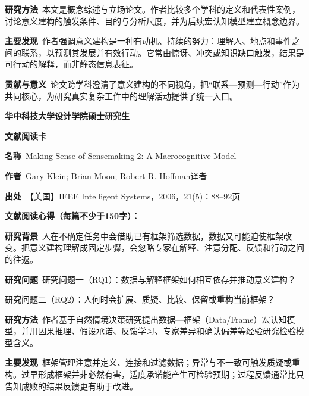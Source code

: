 \noindent\textbf{研究方法}\ 本文是概念综述与立场论文。作者比较多个学科的定义和代表性案例，讨论意义建构的触发条件、目的与分析尺度，并为后续宏认知模型建立概念边界。\par
\noindent\textbf{主要发现}\ 作者强调意义建构是一种有动机、持续的努力：理解人、地点和事件之间的联系，以预测其发展并有效行动。它常由惊讶、冲突或知识缺口触发，结果是可行动的解释，而非静态信息表征。\par
\noindent\textbf{贡献与意义}\ 论文跨学科澄清了意义建构的不同视角，把“联系—预测—行动”作为共同核心，为研究真实复杂工作中的理解活动提供了统一入口。\par
\clearpage
\begin{center}
{\songti\bfseries\fontsize{18.5pt}{27.75pt}\selectfont 华中科技大学设计学院硕士研究生\par}
{\songti\bfseries\fontsize{18.5pt}{27.75pt}\selectfont 文献阅读卡\par}
\end{center}
\vspace{0.25em}
\noindent\underline{}\par
\vspace{0.35em}
\noindent\textbf{名称}\ Making Sense of Sensemaking 2: A Macrocognitive Model\par
\noindent\textbf{作者}\ Gary Klein; Brian Moon; Robert R. Hoffman\quad 译者\par
\noindent\textbf{出处}\ 【美国】IEEE Intelligent Systems，2006，21(5)：88–92\quad 页\par
\vspace{0.35em}
\noindent\textbf{文献阅读心得（每篇不少于150字）：}\par
\noindent\textbf{研究背景}\ 人在不确定任务中会借助已有框架筛选数据，数据又可能迫使框架改变。把意义建构理解成固定步骤，会忽略专家在解释、注意分配、反馈和行动之间的往返。\par
\noindent\textbf{研究问题}\ 研究问题一（RQ1）：数据与解释框架如何相互依存并推动意义建构？\par
研究问题二（RQ2）：人何时会扩展、质疑、比较、保留或重构当前框架？\par
\noindent\textbf{研究方法}\ 作者基于自然情境决策研究提出数据—框架（Data/Frame）宏认知模型，并用因果推理、假设承诺、反馈学习、专家差异和确认偏差等经验研究检验模型含义。\par
\noindent\textbf{主要发现}\ 框架管理注意并定义、连接和过滤数据；异常与不一致可触发质疑或重构。过早形成框架并非必然有害，适度承诺能产生可检验预期；过程反馈通常比只告知成败的结果反馈更有助于改进。\par
